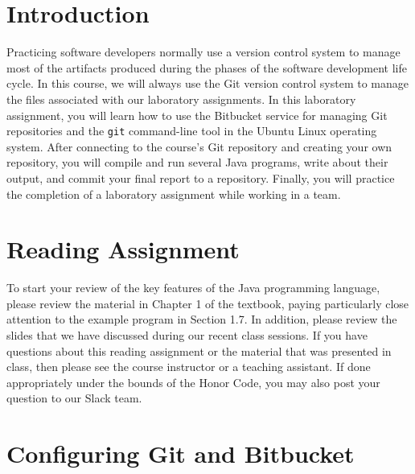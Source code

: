 

\usepackage[compact]{titlesec}



\section*{Introduction}

Practicing software developers normally use a version control system to manage most of the artifacts produced during the
phases of the software development life cycle.  In this course, we will always use the Git version control system to
manage the files associated with our laboratory assignments.  In this laboratory assignment, you will learn how to use
the Bitbucket service for managing Git repositories and the {\tt git} command-line tool in the Ubuntu Linux operating
system. After connecting to the course's Git repository and creating your own repository, you will compile and run
several Java programs, write about their output, and commit your final report to a repository. Finally, you will
practice the completion of a laboratory assignment while working in a team.

\section*{Reading Assignment}

To start your review of the key features of the Java programming language, please review the material in Chapter 1 of
the textbook, paying particularly close attention to the example program in Section 1.7. In addition, please review the
slides that we have discussed during our recent class sessions. If you have questions about this reading assignment or
the material that was presented in class, then please see the course instructor or a teaching assistant. If done
appropriately under the bounds of the Honor Code, you may also post your question to our Slack team.

\section*{Configuring Git and Bitbucket}

